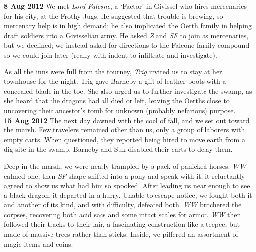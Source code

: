 \documentclass[letterpaper]{article}
\begin{document}
\textbf{8 Aug 2012} We met \emph{Lord Falcone}, a `Factor' in Givissel who hires mercenaries for his city, at the Frothy Jugs.  He suggested that trouble is brewing, so mercenary help is in high demand; he also implicated the Oerth family in helping draft soldiers into a Givisselian army.  He asked \emph{Z} and \emph{SF} to join as mercenaries, but we declined; we instead asked for directions to the Falcone family compound so we could join later (really with indent to infiltrate and investigate).\par
As all the inns were full from the tourney, \emph{Trig} invited us to stay at her townhouse for the night. Trig gave Barneby a gift of leather boots with a concealed blade in the toe. She also urged us to further investigate the swamp, as she heard that the dragons had all died or left, leaving the Oerths close to uncovering their ancestor's tomb for unknown (probably nefarious) purpose.\\

\textbf{15 Aug 2012} The next day dawned with the cool of fall, and we set out toward the marsh. Few travelers remained other than us, only a group of laborers with empty carts. When questioned, they reported being hired to move earth from a dig site in the swamp.  Barneby and Suk disabled their carts to delay them.\par
Deep in the marsh, we were nearly trampled by a pack of panicked horses.  \emph{WW} calmed one, then \emph{SF} shape-shifted into a pony and speak with it; it reluctantly agreed to show us what had him so spooked.  After leading us near enough to see a black dragon, it departed in a hurry. Unable to escape notice, we fought both it and another of its kind, and with difficulty, defeated both. \emph{WW} butchered the corpses, recovering both acid sacs and some intact scales for armor. \emph{WW} then followed their tracks to their lair, a fascinating construction like a teepee, but made of massive trees rather than sticks. Inside, we pilfered an assortment of magic items and coins.\\
\end{document}

